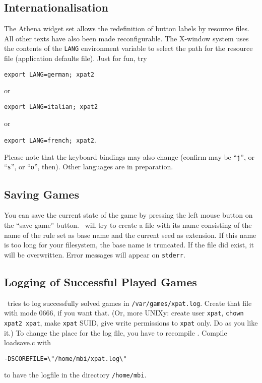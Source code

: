 \subsection{Internationalisation}
The Athena widget set allows the redefinition of button labels by resource
files. All other texts have also been made reconfigurable. The X-window
system uses the contents of the {\tt LANG} environment variable to
select the path for the resource file (application defaults file).
Just for fun, try
\begin{center}
{\tt export LANG=german; xpat2}  
\end{center}
or
\begin{center}
{\tt export LANG=italian; xpat2}
\end{center}
or
\begin{center}
{\tt export LANG=french; xpat2}.
\end{center}
Please note that the keyboard bindings may also change (confirm may be
``{\tt j}'', or ``{\tt s}'', or ``{\tt o}'', then). Other languages are in
preparation.

\subsection{Saving Games}
You can save the current state of the game by pressing the left mouse button on
the ``save game'' button. \xpat\ will try to create a file with its name
consisting of the name of the rule set as base name and the current seed as
extension. If this name is too long for your filesystem, the base name is
truncated.
If the file did exist, it will be overwritten. Error messages will appear on
{\tt stderr}.

\subsection{Logging of Successful Played Games}
\xpat\ tries to log successfully
solved games in {\tt /var/games/xpat.log}. Create that file with mode 0666,
if you want that. (Or, more UNIXy: create user {\tt xpat}, {\tt chown xpat2 xpat},
make {\tt xpat} SUID, give write permissions to {\tt xpat} only. Do as you like it.)
To change the place for the log file, you have to recompile \xpat.
Compile loadsave.c with
\begin{verbatim}
-DSCOREFILE=\"/home/mbi/xpat.log\"
\end{verbatim}
to have the logfile in the directory {\tt /home/mbi}.

